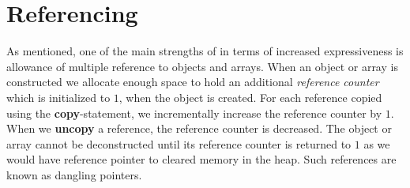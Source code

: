 \section{Referencing}
\label{sec:referencing-compilation}
As mentioned, one of the main strengths of \rooplpp in terms of increased expressiveness is allowance of multiple reference to objects and arrays. When an object or array is constructed we allocate enough space to hold an additional \textit{reference counter} which is initialized to $1$, when the object is created. For each reference copied using the \textbf{copy}-statement, we incrementally increase the reference counter by $1$. When we \textbf{uncopy} a reference, the reference counter is decreased. The object or array cannot be deconstructed until its reference counter is returned to $1$ as we would have reference pointer to cleared memory in the heap. Such references are known as dangling pointers.

